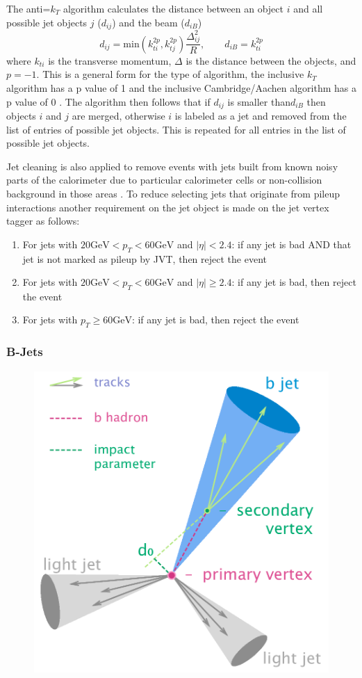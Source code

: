 The anti=$k_T$ algorithm calculates the distance between an object $i$ and all possible jet objects $j$ ($d_{ij}$) and the beam ($d_{iB}$)
\[ d_{ij} = \text{min}(k_{ti}^{2p},k_{tj}^{2p})\frac{\Delta^2_{ij}}{R},\qquad 
d_{iB} = k_{ti}^{2p} \] 
where $k_{ti}$ is the transverse momentum, $\Delta$ is the distance between the objects, and $p=-1$.  This is a general form for the type of algorithm, the inclusive $k_T$ algorithm has a p value of 1 and the inclusive Cambridge/Aachen algorithm has a p value of 0 \cite{CambridgeAachen}.  The algorithm then follows that if $d_{ij}$ is smaller than$d_{iB}$ then objects $i$ and $j$ are merged, otherwise $i$ is labeled as a jet and removed from the list of entries of possible jet objects.  This is repeated for all entries in the list of possible jet objects.

Jet cleaning is also applied to remove events with jets built from known noisy parts of the calorimeter due to particular calorimeter cells or non-collision background in those areas \cite{JetCleaning}.  To reduce selecting jets that originate from pileup interactions another requirement on the jet object is made on the jet vertex tagger \cite{JetJVT, JetCleanTwiki} as follows:
\begin{enumerate}
\item For jets with $20 \mathrm{ GeV } < p_{T} < 60 \mathrm{ GeV }$ and $|\eta| < 2.4$: if any jet is bad AND that jet is not marked as pileup by JVT, then reject the event
\item For jets with $20 \mathrm{ GeV } < p_{T} < 60 \mathrm{ GeV }$ and $|\eta| \geq 2.4$: if any jet is bad, then reject the event
\item For jets with $p_{T} \geq 60 \mathrm{ GeV }$: if any jet is bad, then reject the event
\end{enumerate}
\subsubsection{B-Jets}


\begin{figure}[h!]
	\centering
	\includegraphics[width=.5\columnwidth]{../ThesisImages/Simulation/B-tagging_diagram.png}
	\caption[C]{\cite{Takubo:2017wvt} 
	}
	\label{fig:BTagVars}
\end{figure}

